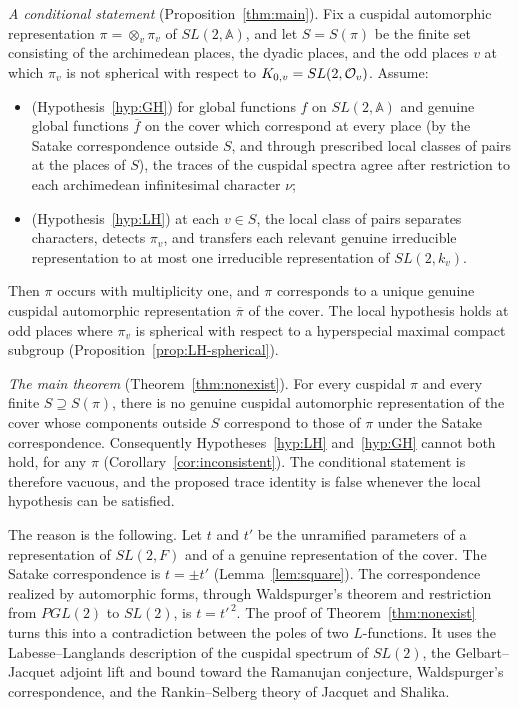 \documentclass[12pt,letterpaper,openany]{book}
\theoremstyle{plain}
\theoremstyle{definition}
\theoremstyle{remark}
\theoremstyle{remark}
\begin{document}
\emph{A conditional statement} (Proposition~\ref{thm:main}).
Fix a cuspidal automorphic representation $\pi=\otimes_v\pi_v$ of
$SL(2,\mathbb{A})$, and let $S=S(\pi)$ be the finite set consisting of the
archimedean places, the dyadic places, and the odd places $v$ at which
$\pi_v$ is not spherical with respect to $K_{0,v}=SL(2,{\cal O}_v)$.
Assume:
\begin{itemize}
\item (Hypothesis~\ref{hyp:GH}) for global functions $f$ on
$SL(2,\mathbb{A})$ and genuine global functions $\overline{f}$ on the cover
which correspond at every place (by the Satake correspondence outside
$S$, and through prescribed local classes of pairs at the places of
$S$), the traces of the cuspidal spectra agree after restriction to
each archimedean infinitesimal character $\nu$;
\item (Hypothesis~\ref{hyp:LH}) at each $v\in S$, the local class of
pairs separates characters, detects $\pi_v$, and transfers each relevant
genuine irreducible representation to at most one irreducible
representation of $SL(2,k_v)$.
\end{itemize}
Then $\pi$ occurs with multiplicity one, and $\pi$ corresponds to a
unique genuine cuspidal automorphic representation $\overline{\pi}$ of
the cover. The local hypothesis holds at odd places where
$\pi_v$ is spherical with respect to a hyperspecial maximal compact
subgroup (Proposition~\ref{prop:LH-spherical}).

\emph{The main theorem} (Theorem~\ref{thm:nonexist}). For every cuspidal
$\pi$ and every finite $S\supseteq S(\pi)$, there is no genuine cuspidal
automorphic representation of the cover whose components outside $S$
correspond to those of $\pi$ under the Satake correspondence. Consequently
Hypotheses~\ref{hyp:LH} and~\ref{hyp:GH} cannot both hold, for any $\pi$
(Corollary~\ref{cor:inconsistent}). The conditional statement is
therefore vacuous, and the proposed trace identity is false whenever the
local hypothesis can be satisfied.

The reason is the following. Let $t$ and $t'$ be the unramified parameters
of a representation of $SL(2,F)$ and of a genuine representation of the
cover. The Satake correspondence is $t=\pm t'$ (Lemma~\ref{lem:square}).
The correspondence realized by automorphic forms, through Waldspurger's
theorem and restriction from $PGL(2)$ to $SL(2)$, is $t=t'^{\,2}$. The
proof of Theorem~\ref{thm:nonexist} turns this into a contradiction between
the poles of two $L$-functions. It uses the Labesse--Langlands description
of the cuspidal spectrum of $SL(2)$, the Gelbart--Jacquet adjoint lift and
bound toward the Ramanujan conjecture, Waldspurger's correspondence, and
the Rankin--Selberg theory of Jacquet and Shalika.
\end{document}
